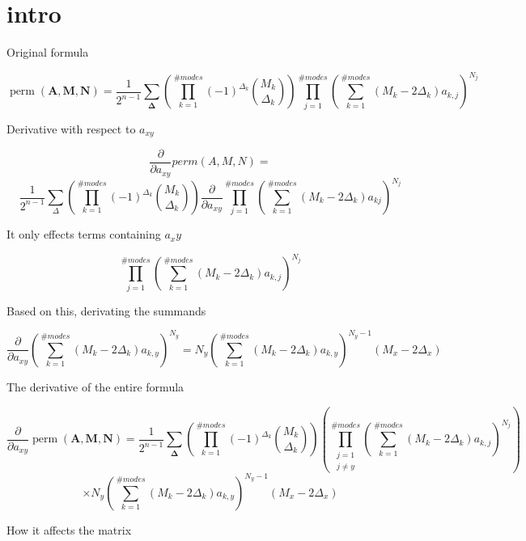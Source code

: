 \documentclass[a4paper]{article}
\theoremstyle{definition}
\begin{document}
\section{intro}

Original formula

\[
  \operatorname{perm}(\boldsymbol{A}, \boldsymbol{M}, \boldsymbol{N}) = \frac{1}{2^{n-1}} \sum_{\boldsymbol{\Delta}} \left( \prod_{k=1}^{\#modes } (-1)^{\Delta_{k}} \binom{M_{k}}{\Delta_{k}} \right) \prod_{j=1}^{\# modes } \left( \sum_{k=1}^{\# modes} \left( M_{k} - 2 \Delta_{k} \right) a_{k, j} \right)^{N_{j}}
\]

\noindent
Derivative with respect to $a_{xy}$

\[
  \frac{\partial}{\partial a_{xy}}perm(A, M, N) =
\]
\[
  \frac{1}{2^{n-1}}\sum_{\Delta}\left(\prod_{k=1}^{\#modes}(-1)^{\Delta_{k}}\binom{M_{k}}{\Delta_{k}}\right)\frac{\partial}{\partial a_{xy}}\prod_{j=1}^{\#modes}\left(\sum_{k=1}^{\#modes}(M_{k}-2\Delta_{k})a_{kj}\right)^{N_{j}}
\]

\noindent
It only effects terms containing $a_xy$

\[
  \prod_{j=1}^{\#modes}\left(\sum_{k=1}^{\#modes}\left(M_{k}-2 \Delta_{k}\right) a_{k, j}\right)^{N_{j}}
\]

\noindent
Based on this, derivating the summands

\[
  \frac{\partial}{\partial a_{xy}} \left( \sum_{k=1}^{\#modes } \left( M_{k} - 2 \Delta_{k} \right) a_{k, y} \right)^{N_{y}} = N_{y} \left( \sum_{k=1}^{\#modes} \left( M_{k} - 2 \Delta_{k} \right) a_{k, y} \right)^{N_{y} - 1} (M_{x} - 2 \Delta_{x})
\]

\noindent
The derivative of the entire formula

\[
  \frac{\partial}{\partial a_{xy}} \operatorname{perm}(\boldsymbol{A}, \boldsymbol{M}, \boldsymbol{N}) = \frac{1}{2^{n-1}} \sum_{\boldsymbol{\Delta}} \left( \prod_{k=1}^{\# { modes }} (-1)^{\Delta_{k}} \binom{M_{k}}{\Delta_{k}} \right) \left( \prod_{\substack{j=1 \\ j \neq y}}^{\# { modes }} \left( \sum_{k=1}^{\# { modes }} \left( M_{k} - 2 \Delta_{k} \right) a_{k, j} \right)^{N_{j}} \right)
\]
\[
  \times N_{y} \left( \sum_{k=1}^{\# { modes }} \left( M_{k} - 2 \Delta_{k} \right) a_{k, y} \right)^{N_{y} - 1} (M_{x} - 2 \Delta_{x})
\]

\noindent
How it affects the matrix
\end{document}
